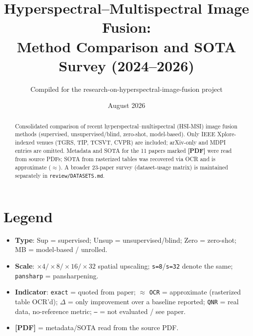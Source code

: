 \documentclass[11pt]{article}
\title{Hyperspectral--Multispectral Image Fusion:\\
Method Comparison and SOTA Survey (2024--2026)}
\author{Compiled for the research-on-hyperspectral-image-fusion project}
\date{August 2026}
\begin{document}
\maketitle

\begin{abstract}
Consolidated comparison of recent hyperspectral--multispectral (HSI-MSI) image
fusion methods (supervised, unsupervised/blind, zero-shot, model-based). Only
IEEE Xplore-indexed venues (TGRS, TIP, TCSVT, CVPR) are included; arXiv-only
and MDPI entries are omitted. Metadata and SOTA for the 11 papers marked
\textbf{[PDF]} were read from source PDFs; SOTA from rasterized tables was
recovered via OCR and is approximate ($\approx$). A broader 23-paper survey
(dataset-usage matrix) is maintained separately in \texttt{review/DATASETS.md}.
\end{abstract}

\section*{Legend}
\begin{itemize}
  \item \textbf{Type}: Sup = supervised; Unsup = unsupervised/blind;
        Zero = zero-shot; MB = model-based / unrolled.
  \item \textbf{Scale}: $\times4/\times8/\times16/\times32$ spatial upscaling;
        \texttt{s=8}/\texttt{s=32} denote the same; \texttt{pansharp} = pansharpening.
  \item \textbf{Indicator}: \texttt{exact} = quoted from paper; $\approx$ \texttt{OCR}
        = approximate (rasterized table OCR'd); $\Delta$ = only improvement over a
        baseline reported; \texttt{QNR} = real data, no-reference metric;
        \texttt{--} = not evaluated / see paper.
  \item \textbf{[PDF]} = metadata/SOTA read from the source PDF.
\end{itemize}
\end{document}
